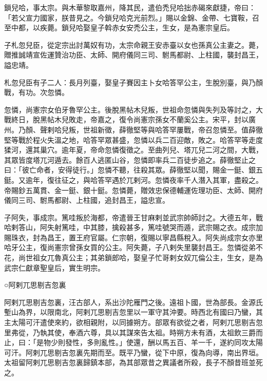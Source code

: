 \begin{pinyinscope}
 鎖兒哈，事太宗。與木華黎取嘉州，降其民，遣伯禿兒哈拙赤碣來獻捷，帝曰：「若父宣力國家，朕昔見之。今鎖兒哈克光前烈。」賜以金錦、金帶、七寶鞍，召至中都，以疾薨。鎖兒哈娶皇子斡赤女安禿公主，生女，是為憲宗皇后。



 子札忽兒臣，從定宗出討萬奴有功，太宗命親王安赤臺以女也孫真公主妻之。薨，贈推誠靖宣佐運贊治功臣、太師、開府儀同三司、駙馬都尉、上柱國，襲封昌王，謚忠靖。



 札忽兒臣有子二人：長月列臺，娶皇子賽因主卜女哈答罕公主，生脫別臺，與乃顏戰，有功。次忽憐。



 忽憐，尚憲宗女伯牙魯罕公主。後脫黑帖木兒叛，世祖命忽憐與失列及等討之，大戰終日，脫黑帖木兒敗走，帝嘉之，復令尚憲宗孫女不蘭奚公主。宋平，封以廣州。乃顏、聲剌哈兒叛，世祖新徵，薛徹堅等與哈答罕屢戰，帝召忽憐至。值薛徹堅等戰於程火失溫之地，哈答罕眾甚盛，忽憐以兵二百迎敵，敗之。哈答罕等走度猱河，還其巢穴。逾年夏，帝命忽憐復徵之。至曲列兒、塔兀兒二河之間，大戰，其眾皆度塔兀河遁去。餘百人逃匿山谷，忽憐即率兵二百徒步追之。薛徹堅止之曰：「彼亡命者，安得徒行。」忽憐不聽，往殺其眾。薛徹堅以聞，賜金一鋌、銀五鋌。又逾年，復往征之，與哈答罕遇於兀剌河。忽憐夜率千人潛入其軍，盡殺之。帝賜鈔五萬貫、金一鋌、銀十鋌。忽憐薨，贈效忠保德輔運佐理功臣、太師、開府儀同三司、駙馬都尉、上柱國，追封昌王，謚忠宣。



 子阿失，事成宗。篤哇叛於海都，帝遣晉王甘麻剌並武宗帥師討之。大德五年，戰哈剌答山，阿失射篤哇，中其膝，擒殺甚多，篤哇號哭而遁，武宗賜之衣。成宗加賜珠衣，封為昌王，置王府官屬。仁宗朝，復賜以寧昌縣稅入。阿失尚成宗女亦里哈牙公主，復尚憲宗曾孫女買的公主。阿失薨，子八剌失里襲封昌王。忽憐從弟不花，尚世祖女兀魯真公主；其弟鎖郎哈，娶皇子忙哥剌女奴兀倫公主，生女，是為武宗仁獻章聖皇后，實生明宗。



 ○阿剌兀思剔吉忽裏



 阿剌兀思剔吉忽裏，汪古部人，系出沙陀雁門之後。遠祖卜國，世為部長。金源氏塹山為界，以限南北，阿剌兀思剔吉忽里以一軍守其沖要。時西北有國曰乃蠻，其主太陽可汗遣使來約，欲相親附，以同據朔方。部眾有欲從之者，阿剌兀思剔吉忽里弗從，乃執其使，奉酒六尊，具以其謀來告太祖。時朔方未有酒，太祖飲三爵而止，曰：「是物少則發性，多則亂性。」使還，酬以馬五百、羊一千，遂約同攻太陽可汗。阿剌兀思剔吉忽裏先期而至。既平乃蠻，從下中原，復為向導，南出界垣。太祖留阿剌兀思剔吉忽裏歸鎮本部，為其部眾昔之異議者所殺，長子不顏昔班並死之。




\end{pinyinscope}

